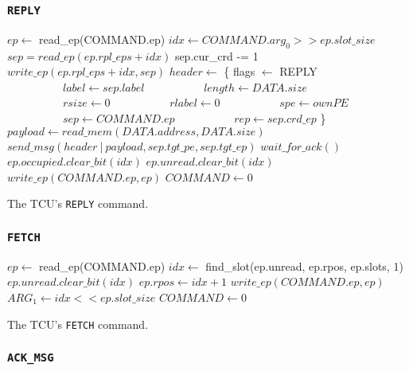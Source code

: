 \documentclass[a4paper,11pt]{article}
\begin{document}
\subsubsection{\texttt{REPLY}}

\begin{algorithm}[H]
    $ep \gets$ read\_ep(COMMAND.ep)\;
    \BlankLine
    $idx \gets COMMAND.arg_0 >> ep.slot\_size$\;
    $sep = read\_ep(ep.rpl\_eps + idx)$\;
    \BlankLine
    sep.cur\_crd -= 1\;
    $write\_ep(ep.rpl\_eps + idx, sep)$\;
    \BlankLine
    $header \gets$ \{ flags $\gets$ REPLY\;
    $\quad\quad\quad\quad\quad label \gets sep.label$\;
    $\quad\quad\quad\quad\quad length \gets DATA.size$\;
    $\quad\quad\quad\quad\quad rsize \gets 0$\;
    $\quad\quad\quad\quad\quad rlabel \gets 0$\;
    $\quad\quad\quad\quad\quad spe \gets ownPE$\;
    $\quad\quad\quad\quad\quad sep \gets COMMAND.ep$\;
    $\quad\quad\quad\quad\quad rep \gets sep.crd\_ep$ \}\;
    $payload \gets read\_mem(DATA.address, DATA.size)$\;
    $send\_msg(header\ |\ payload, sep.tgt\_pe, sep.tgt\_ep)$\;
    $wait\_for\_ack()$\;
    \BlankLine
    $ep.occupied.clear\_bit(idx)$\;
    $ep.unread.clear\_bit(idx)$\;
    $write\_ep(COMMAND.ep, ep)$\;
    \BlankLine
    $COMMAND \gets 0$\;
    \caption{The TCU's \texttt{REPLY} command.}
\end{algorithm}

\subsubsection{\texttt{FETCH}}

\begin{algorithm}[H]
    $ep \gets$ read\_ep(COMMAND.ep)\;
    \BlankLine
    $idx \gets$ find\_slot(ep.unread, ep.rpos, ep.slots, 1)\;
    $ep.unread.clear\_bit(idx)$\;
    $ep.rpos \gets idx + 1$\;
    $write\_ep(COMMAND.ep, ep)$\;
    \BlankLine
    $ARG_1 \gets idx << ep.slot\_size$\;
    $COMMAND \gets 0$\;
    \caption{The TCU's \texttt{FETCH} command.}
\end{algorithm}

\subsubsection{\texttt{ACK\_MSG}}
\end{document}
